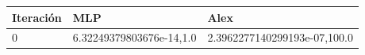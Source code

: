 \begin{tabular}{lll}
\toprule
Iteración & MLP & Alex \\
\midrule
0 & 6.32249379803676e-14,1.0 & 2.3962277140299193e-07,100.0 \\
\bottomrule
\end{tabular}

